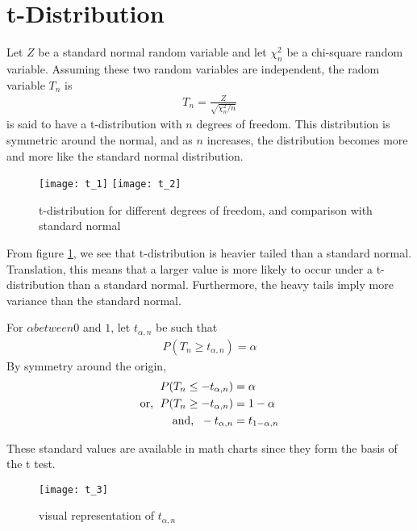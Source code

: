 \documentclass[../probability-notes.tex]{subfiles}
\begin{document}
    \section{t-Distribution}
    Let $Z$ be a standard normal random variable and let $\chi_{n}^{2}$ be a chi-square random variable. Assuming these two random variables are independent, the radom variable $T_{n}$ is
    \begin{align*}
        T_{n} = \frac{Z}{\sqrt{\chi_{n}^{2}/n}}
    \end{align*}
    is said to have a t-distribution with $n$ degrees of freedom.\newline
    This distribution is symmetric around the normal, and as $n$ increases, the distribution becomes more and more like the standard normal distribution.

    \begin{figure}[h]
    \texttt{[image: t\_1]}
    \texttt{[image: t\_2]}
    \centering
    \caption{t-distribution for different degrees of freedom, and comparison with standard normal}
    \label{fig:t_1} %
    \end{figure}

    From figure \ref{fig:t_1}, we see that t-distribution is heavier tailed than a standard normal. Translation, this means that a larger value is more likely to occur under a t-distribution than a standard normal. Furthermore, the heavy tails imply more variance than the standard normal.\newline

    For $\alpha between 0$ and $1$, let $t_{\alpha, n}$ be such that
    \begin{align*}
        P(T_{n} \geq t_{\alpha, n}) = \alpha
    \end{align*}
    By symmetry around the origin,
    \begin{align*}
        P(T_{n} \leq -t_{\alpha, n}) &= \alpha\\
        \text{or, \;} P(T_{n} \geq -t_{\alpha, n}) &= 1 - \alpha\\
        \text{and, \;} -t_{\alpha, n} &= t_{1 - \alpha, n}
    \end{align*}

    These standard values are available in math charts since they form the basis of the t test.

    \begin{figure}[h]
    \texttt{[image: t\_3]}
    \centering
    \caption{visual representation of $t_{\alpha,n}$}
    \label{fig:t_2} %
    \end{figure}
\end{document}

